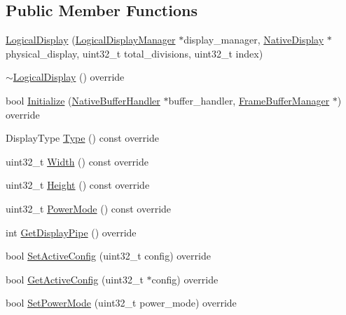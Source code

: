 \subsection*{Public Member Functions}
\begin{DoxyCompactItemize}
\item 
\mbox{\hyperlink{classhwcomposer_1_1LogicalDisplay_a1982d5bd3dd45fffdddfdba4cd648ae7}{Logical\+Display}} (\mbox{\hyperlink{classhwcomposer_1_1LogicalDisplayManager}{Logical\+Display\+Manager}} $\ast$display\+\_\+manager, \mbox{\hyperlink{classhwcomposer_1_1NativeDisplay}{Native\+Display}} $\ast$physical\+\_\+display, uint32\+\_\+t total\+\_\+divisions, uint32\+\_\+t index)
\item 
\mbox{\hyperlink{classhwcomposer_1_1LogicalDisplay_a6a86f5635e1dbb28026b048219ce562c}{$\sim$\+Logical\+Display}} () override
\item 
bool \mbox{\hyperlink{classhwcomposer_1_1LogicalDisplay_a280447edbcba240ec782928273d87c65}{Initialize}} (\mbox{\hyperlink{classhwcomposer_1_1NativeBufferHandler}{Native\+Buffer\+Handler}} $\ast$buffer\+\_\+handler, \mbox{\hyperlink{classhwcomposer_1_1FrameBufferManager}{Frame\+Buffer\+Manager}} $\ast$) override
\item 
Display\+Type \mbox{\hyperlink{classhwcomposer_1_1LogicalDisplay_a012b2a742cfd590405db34ff68f919a9}{Type}} () const override
\item 
uint32\+\_\+t \mbox{\hyperlink{classhwcomposer_1_1LogicalDisplay_a788d88b267f7d36ad6e70f523fd16c97}{Width}} () const override
\item 
uint32\+\_\+t \mbox{\hyperlink{classhwcomposer_1_1LogicalDisplay_a8c687fb1727e18b8a74db9740eccca88}{Height}} () const override
\item 
uint32\+\_\+t \mbox{\hyperlink{classhwcomposer_1_1LogicalDisplay_af0fd1b1d9b574403e9c4680f7b371c21}{Power\+Mode}} () const override
\item 
int \mbox{\hyperlink{classhwcomposer_1_1LogicalDisplay_acd2630578257e1156d5e00b304df2db8}{Get\+Display\+Pipe}} () override
\item 
bool \mbox{\hyperlink{classhwcomposer_1_1LogicalDisplay_aa758516a35c9f74cc34f4b679fa33307}{Set\+Active\+Config}} (uint32\+\_\+t config) override
\item 
bool \mbox{\hyperlink{classhwcomposer_1_1LogicalDisplay_a8a88b08fd54dd02debe436718c569fff}{Get\+Active\+Config}} (uint32\+\_\+t $\ast$config) override
\item 
bool \mbox{\hyperlink{classhwcomposer_1_1LogicalDisplay_aed95336a0e93791e9e97b5e1c0940a7e}{Set\+Power\+Mode}} (uint32\+\_\+t power\+\_\+mode) override

\end{DoxyCompactItemize}
